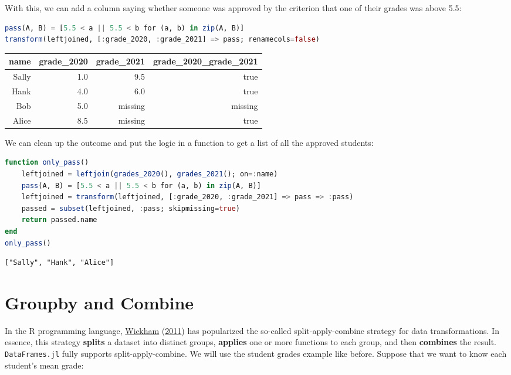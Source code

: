 \documentclass[
  notoc %
]{tufte-book}
\newcommand{\passthrough}[1]{#1}
\begin{document}
With this, we can add a column saying whether someone was approved by
the criterion that one of their grades was above 5.5:

\begin{lstlisting}[language=Julia]
pass(A, B) = [5.5 < a || 5.5 < b for (a, b) in zip(A, B)]
transform(leftjoined, [:grade_2020, :grade_2021] => pass; renamecols=false)
\end{lstlisting}

\begin{longtable}[]{@{}rrrr@{}}
\toprule
name & grade\_2020 & grade\_2021 & grade\_2020\_grade\_2021 \\
\midrule
\endhead
Sally & 1.0 & 9.5 & true \\
Hank & 4.0 & 6.0 & true \\
Bob & 5.0 & missing & missing \\
Alice & 8.5 & missing & true \\
\bottomrule
\end{longtable}

We can clean up the outcome and put the logic in a function to get a
list of all the approved students:

\begin{lstlisting}[language=Julia]
function only_pass()
    leftjoined = leftjoin(grades_2020(), grades_2021(); on=:name)
    pass(A, B) = [5.5 < a || 5.5 < b for (a, b) in zip(A, B)]
    leftjoined = transform(leftjoined, [:grade_2020, :grade_2021] => pass => :pass)
    passed = subset(leftjoined, :pass; skipmissing=true)
    return passed.name
end
only_pass()
\end{lstlisting}

\begin{lstlisting}[language=Output]
["Sally", "Hank", "Alice"]
\end{lstlisting}

\hypertarget{sec:groupby_combine}{%
\section{Groupby and Combine}\label{sec:groupby_combine}}

In the R programming language,
\protect\hyperlink{ref-wickham2011split}{Wickham}
(\protect\hyperlink{ref-wickham2011split}{2011}) has popularized the
so-called split-apply-combine strategy for data transformations. In
essence, this strategy \textbf{splits} a dataset into distinct groups,
\textbf{applies} one or more functions to each group, and then
\textbf{combines} the result. \passthrough{\lstinline!DataFrames.jl!}
fully supports split-apply-combine. We will use the student grades
example like before. Suppose that we want to know each student's mean
grade:
\end{document}
